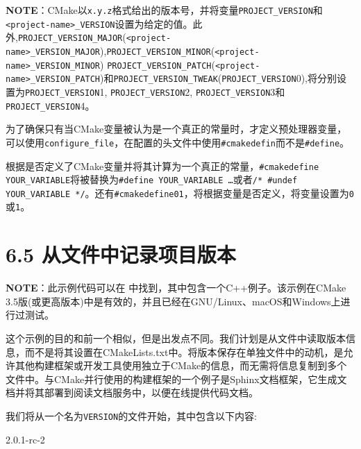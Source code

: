 \begin{myInfoBox}
\textbf{NOTE}：CMake以\texttt{x.y.z}格式给出的版本号，并将变量\texttt{PROJECT\_VERSION}和\texttt{ <project-name>\_VERSION}设置为给定的值。此外,\texttt{PROJECT\_VERSION\_MAJOR}(\texttt{<project-name>\_VERSION\_MAJOR}),\texttt{PROJECT\_VERSION\_MINOR}(\texttt{<project-name>\_VERSION\_MINOR}) \texttt{PROJECT\_VERSION\_PATCH}(\texttt{<project-name>\_VERSION\_PATCH})和\texttt{PROJECT\_VERSION\_TWEAK}(\texttt{PROJECT\_VERSION}0),将分别设置为\texttt{PROJECT\_VERSION}1, \texttt{PROJECT\_VERSION}2, \texttt{PROJECT\_VERSION}3和\texttt{PROJECT\_VERSION}4。
\end{myInfoBox}


为了确保只有当CMake变量被认为是一个真正的常量时，才定义预处理器变量，可以使用\texttt{configure\_file}，在配置的头文件中使用\texttt{\#cmakedefin}而不是\texttt{\#define}。

根据是否定义了CMake变量并将其计算为一个真正的常量，\texttt{\#cmakedefine YOUR\_VARIABLE}将被替换为\texttt{\#define YOUR\_VARIABLE …}或者\texttt{/* \#undef YOUR\_VARIABLE */}。还有\texttt{\#cmakedefine01}，将根据变量是否定义，将变量设置为\texttt{0}或\texttt{1}。


\section{6.5 从文件中记录项目版本}

\begin{myInfoBox}
\textbf{NOTE}：此示例代码可以在  中找到，其中包含一个C++例子。该示例在CMake 3.5版(或更高版本)中是有效的，并且已经在GNU/Linux、macOS和Windows上进行过测试。
\end{myInfoBox}

这个示例的目的和前一个相似，但是出发点不同。我们计划是从文件中读取版本信息，而不是将其设置在CMakeLists.txt中。将版本保存在单独文件中的动机，是允许其他构建框架或开发工具使用独立于CMake的信息，而无需将信息复制到多个文件中。与CMake并行使用的构建框架的一个例子是Sphinx文档框架，它生成文档并将其部署到阅读文档服务中，以便在线提供代码文档。


我们将从一个名为\texttt{VERSION}的文件开始，其中包含以下内容:

\begin{codebox}[text]
2.0.1-rc-2
\end{codebox}


